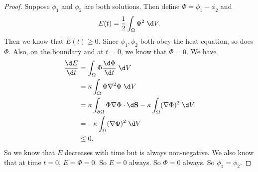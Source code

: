 \documentclass[a4paper]{article}
\begin{document}
\begin{proof}
  Suppose $\phi_1$ and $\phi_2$ are both solutions. Then define $\Phi = \phi_1 - \phi_2$ and
  \[
    E(t) = \frac{1}{2}\int_\Omega \Phi^2 \;\d V.
  \]
  Then we know that $E(t) \geq 0$. Since $\phi_1, \phi_2$ both obey the heat equation, so does $\Phi$. Also, on the boundary and at $t = 0$, we know that $\Phi = 0$. We have
  \begin{align*}
    \frac{\d E}{\d t} &= \int_\Omega \Phi \frac{\d \Phi}{\d t}\;\d V\\
    &= \kappa \int_\Omega \Phi \nabla^2 \Phi\;\d V\\
    &= \kappa \int_{\partial \Omega} \Phi \nabla \Phi \cdot \d \mathbf{S} - \kappa \int_\Omega (\nabla \Phi)^2\;\d V\\
    &= - \kappa \int_\Omega (\nabla \Phi)^2\;\d V\\
    &\leq 0.
  \end{align*}
  So we know that $E$ decreases with time but is always non-negative. We also know that at time $t = 0$, $E = \Phi = 0$. So $E = 0$ always. So $\Phi = 0$ always. So $\phi_1 = \phi_2$.
\end{proof}
\end{document}
